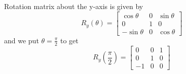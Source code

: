 Rotation matrix about the y-axis is given by
\begin{equation*}
    R_y(\theta)
    =
    \begin{bmatrix}
        \cos \theta  & 0 & \sin \theta \\
        0            & 1 & 0           \\
        -\sin \theta & 0 & \cos \theta
    \end{bmatrix}
\end{equation*}
and we put \( \theta = \frac{\pi}{2} \) to get
\begin{equation*}
    R_y\left(\frac{\pi}{2}\right)
    =
    \begin{bmatrix}
        0  & 0 & 1 \\
        0  & 1 & 0 \\
        -1 & 0 & 0
    \end{bmatrix}
\end{equation*}
